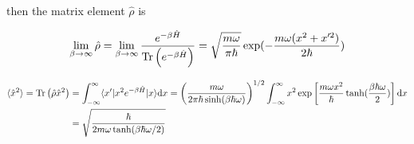 then the matrix element $\hat{\rho}$ is

\begin{equation}
    \lim_{\beta\rightarrow\infty}\hat{\rho} = \lim_{\beta\rightarrow\infty}\frac{e^{-\beta\hat{H}}}{\operatorname{Tr}\left(e^{-\beta\hat{H}}\right)} = \sqrt{\frac{m\omega}{\pi\hbar}}\exp(-\frac{m\omega(x^2+x'^2)}{2\hbar})
\end{equation}

\begin{align}
    \begin{split}
        \langle \hat{x}^2\rangle = \operatorname{Tr}\left(\hat{\rho}\hat{x}^2\right) &= \int_{-\infty}^{\infty}\langle x'|x^2e^{-\beta\hat{H}}|x\rangle\mathrm{d}x = \left(\frac{m\omega}{2\pi\hbar\sinh(\beta\hbar\omega)}\right)^{1/2} \int_{-\infty}^{\infty} x^2\exp\left[\frac{m\omega x^2}{\hbar}\tanh(\frac{\beta\hbar\omega}{2})\right]\mathrm{d}x \\
        &= \sqrt{\frac{\hbar}{2m\omega\tanh(\beta\hbar\omega/2)}}
    \end{split}
\end{align}
